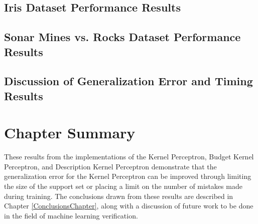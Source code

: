 \subsection{Iris Dataset Performance Results}\label{IrisResults}
\subsection{Sonar Mines vs. Rocks Dataset Performance Results}\label{SonarResults}
\subsection{Discussion of Generalization Error and Timing Results}\label{ResultsDiscussion}
\section{Chapter Summary}\label{ResultsChapterSummarySection}
These results from the implementations of the Kernel Perceptron, Budget Kernel Perceptron, and Description Kernel Perceptron demonstrate that the generalization error for the Kernel Perceptron can be improved through limiting the size of the support set or placing a limit on the number of mistakes made during training. The conclusions drawn from these results are described in Chapter \ref{ConclusionsChapter}, along with a discussion of future work to be done in the field of machine learning verification.
